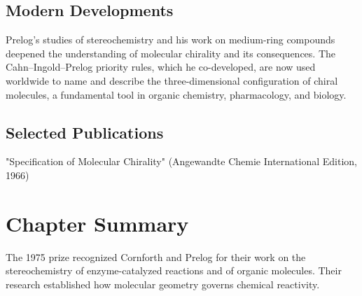 \subsection*{Modern Developments}

Prelog's studies of stereochemistry and his work on medium-ring compounds deepened the understanding of molecular chirality and its consequences. The Cahn–Ingold–Prelog priority rules, which he co-developed, are now used worldwide to name and describe the three-dimensional configuration of chiral molecules, a fundamental tool in organic chemistry, pharmacology, and biology.

\subsection*{Selected Publications}

"Specification of Molecular Chirality" (Angewandte Chemie International Edition, 1966)

\clearpage

\section*{Chapter Summary}

The 1975 prize recognized Cornforth and Prelog for their work on the stereochemistry of enzyme-catalyzed reactions and of organic molecules. Their research established how molecular geometry governs chemical reactivity.

